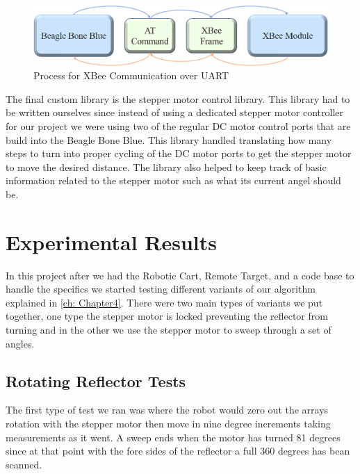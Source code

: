 \begin{figure} [b]
  \centering
  \includegraphics[width=\textwidth]{figs/img/Command Process Diagram.png}
  \caption{Process for XBee Communication over UART}
  \label{fig:CommandProcessDiagram}
\end{figure}

\vspace*{12pt}
\noindent
The final custom library is the stepper motor control library.  This library had to be written ourselves since instead of using a dedicated stepper motor controller for our project we were using two of the regular DC motor control ports that are build into the Beagle Bone Blue.  This library handled translating how many steps to turn into proper cycling of the DC motor ports to get the stepper motor to move the desired distance.  The library also helped to keep track of basic information related to the stepper motor such as what its current angel should be.

\section{Experimental Results}
\label{sec:Experimental Results}

In this project after we had the Robotic Cart, Remote Target, and a code base to handle the specifics we started testing different variants of our algorithm explained in \autoref{ch: Chapter4}. There were two main types of variants we put together, one type the stepper motor is locked preventing the reflector from turning and in the other we use the stepper motor to sweep through a set of angles.

\subsection{Rotating Reflector Tests}

The first type of test we ran was where the robot would zero out the arrays rotation with the stepper motor then move in nine degree increments taking measurements as it went. A sweep ends when the motor has turned 81 degrees since at that point with the fore sides of the reflector a full 360 degrees has bean scanned.

